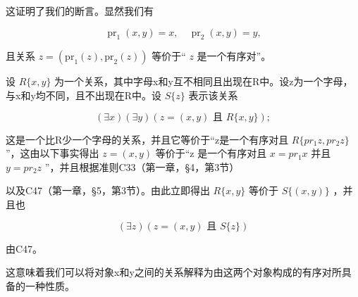 这证明了我们的断言。显然我们有

\[
\operatorname{pr} _ {1} (x, y) = x, \quad \operatorname{pr} _ {2} (x, y) = y,
\]

且关系 \(z = (\mathrm{pr}_1(z), \mathrm{pr}_2(z))\) 等价于“ \(z\) 是一个有序对”。

设 \(R\{x, y\}\) 为一个关系，其中字母x和y互不相同且出现在R中。设z为一个字母，与x和y均不同，且不出现在R中。设 \(S\{z\}\) 表示该关系

\[
(\exists x) (\exists y) (z = (x, y) \text {   且   } R \{x, y \});
\]

这是一个比R少一个字母的关系，并且它等价于“z是一个有序对且 \(R\{pr_{1}z, pr_{2}z\}\) ”，这由以下事实得出 \(z = (x, y)\) 等价于“z 是一个有序对且 \(x = pr_{1}x\) 并且 \(y = pr_{2}z\) ''，并且根据准则C33（第一章，§4，第3节）

以及C47（第一章，§5，第3节）。由此立即得出 \(R\{x, y\}\) 等价于 \(S\{(x, y)\}\) ，并且也

\[
(\exists z) (z = (x, y) \text {   且   } S \{z \})
\]

由C47。

这意味着我们可以将对象x和y之间的关系解释为由这两个对象构成的有序对所具备的一种性质。

